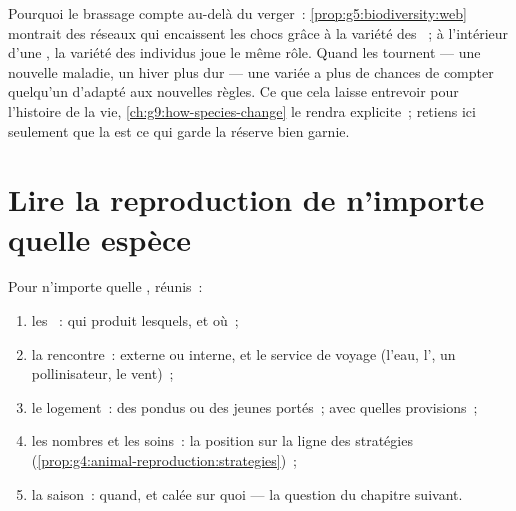 \begin{remark}\label{rem:g8:sexual-reproduction:reserve}
Pourquoi le brassage compte au-delà du verger~:
\cref{prop:g5:biodiversity:web} montrait des réseaux qui encaissent
les chocs grâce à la variété des ~; à l'intérieur d'une
, la variété des individus joue le même rôle. Quand les
 tournent --- une nouvelle maladie, un hiver plus dur ---
une  variée a plus de chances de compter quelqu'un d'adapté
aux nouvelles règles. Ce que cela laisse entrevoir pour l'histoire
de la vie, \cref{ch:g9:how-species-change} le rendra explicite~;
retiens ici seulement que la  est ce qui garde la
réserve bien garnie.
\end{remark}

\section{Lire la reproduction de n'importe quelle espèce}

\begin{method}\label{met:g8:sexual-reproduction:dossier}
Pour n'importe quelle , réunis~:
\begin{enumerate}
  \item les ~: qui produit lesquels, et où~;
  \item la rencontre~:  externe ou interne, et le
        service de voyage (l'eau, l', un pollinisateur,
        le vent)~;
  \item le logement~: des  pondus ou des jeunes portés~; avec
        quelles provisions~;
  \item les nombres et les soins~: la position sur la ligne des
        stratégies
        (\cref{prop:g4:animal-reproduction:strategies})~;
  \item la saison~: quand, et calée sur quoi --- la question du
        chapitre suivant.
\end{enumerate}
\end{method}

